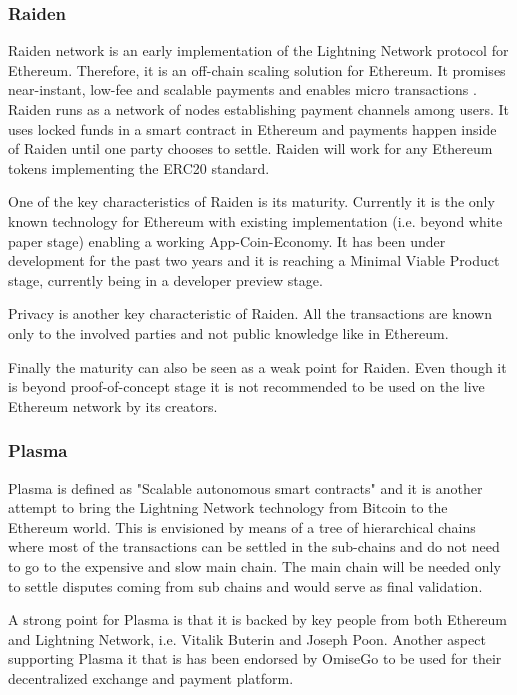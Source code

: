 \subsubsection{Raiden}
Raiden network is an early implementation of the Lightning Network protocol for Ethereum. Therefore, it is an off-chain scaling solution for Ethereum. It promises near-instant, low-fee and scalable payments and enables micro transactions \cite{Raiden}. Raiden runs as a network of nodes establishing payment channels among users. It uses locked funds in a smart contract in Ethereum and payments happen inside of Raiden until one party chooses to settle. Raiden will work for any Ethereum tokens implementing the ERC20 standard.

One of the key characteristics of Raiden is its maturity. Currently it is the only known technology for Ethereum with existing implementation (i.e. beyond white paper stage) enabling a working App-Coin-Economy. It has been under development for the past two years and it is reaching a Minimal Viable Product stage, currently being in a developer preview stage.

Privacy is another key characteristic of Raiden.  All the transactions are known only to the involved parties and not public knowledge like in Ethereum.

Finally the maturity can also be seen as a weak point for Raiden. Even though it is beyond proof-of-concept stage it is not recommended to be used on the live Ethereum network by its creators.

\subsubsection{Plasma}
Plasma is defined as "Scalable autonomous smart contracts" \cite{Plasma} and it is another attempt to bring the Lightning Network technology from Bitcoin to the Ethereum world. This is envisioned by means of a tree of hierarchical chains where most of the transactions can be settled in the sub-chains and do not need to go to the expensive and slow main chain. The main chain will be needed only to settle disputes coming from sub chains and would serve as final validation.

A strong point for Plasma is that it is backed by key people from both Ethereum and Lightning Network, i.e. Vitalik Buterin and Joseph Poon. Another aspect supporting Plasma it that is has been endorsed by OmiseGo to be used for their decentralized exchange and payment platform\cite{omisego_plasma}.

